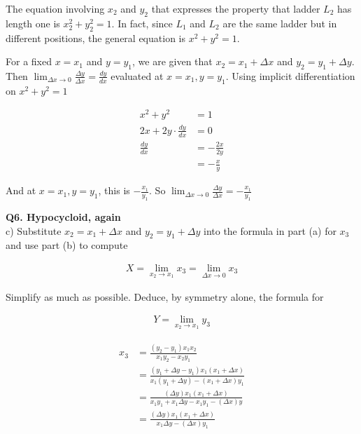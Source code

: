 \documentclass[9pt]{article}
\begin{document}
The equation involving $x_2$ and $y_2$ that expresses the property that ladder $L_2$ has length one is $x_2^2 + y_2^2 = 1$. In fact, since $L_1$ and $L_2$ are the same ladder but in different positions, the general equation is $x^2 + y^2 = 1$.

For a fixed $x = x_1$ and $y = y_1$, we are given that $x_2 = x_1 + \Delta x$ and $y_2 = y_1 + \Delta y$. Then $\lim_{\Delta x \rightarrow 0}\frac{\Delta y}{\Delta x} = \frac{dy}{dx}$ evaluated at $x = x_1, y = y_1$. Using implicit differentiation on $x^2 + y^2 = 1$

\begin{align*}
  x^2 + y^2 &= 1 \\
  2x + 2y \cdot \frac{dy}{dx} &= 0 \\
  \frac{dy}{dx} &= -\frac{2x}{2y} \\
                &= -\frac{x}{y}
\end{align*}

And at $x = x_1, y = y_1$, this is $-\frac{x_1}{y_1}$. So $\lim_{\Delta x \rightarrow 0}\frac{\Delta y}{\Delta x} = -\frac{x_1}{y_1}$

\begin{tcolorbox}
  \textbf{Q6. Hypocycloid, again} \\
  c) Substitute $x_2 = x_1 + \Delta x$ and $y_2 = y_1 + \Delta y$ into the formula in part (a) for $x_3$ and use part (b) to compute

  \begin{align*}
    X = \lim_{x_2 \rightarrow x_1} x_3 = \lim_{\Delta x \rightarrow 0} x_3
  \end{align*}

  Simplify as much as possible. Deduce, by symmetry alone, the formula for

  \begin{align*}
    Y = \lim_{x_2 \rightarrow x_1} y_3
  \end{align*}
\end{tcolorbox}

\begin{align*}
  x_3 &= \frac{(y_2 - y_1) x_1 x_2}{x_1 y_2 - x_2 y_1} \\
      &= \frac{(y_1 + \Delta y - y_1) x_1 (x_1 + \Delta x)}{x_1 (y_1 + \Delta y) - (x_1 + \Delta x) y_1} \\
      &= \frac{(\Delta y) x_1 (x_1 + \Delta x)}{x_1 y_1 + x_1 \Delta y - x_1 y_1 - (\Delta x) y} \\
      &= \frac{(\Delta y) x_1 (x_1 + \Delta x)}{x_1 \Delta y - (\Delta x) y_1}
\end{align*}
\end{document}
